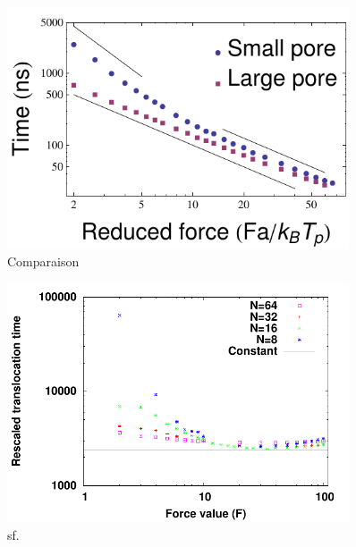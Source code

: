 \begin{figure}[H]
\begin{center}
\includegraphics[width=0.9\textwidth]{poresizecomp.pdf} 
\caption[Temps de translocation du polymère structuré, comparaison]{Comparaison}
\label{compporesize}
\end{center}
\end{figure}



\begin{figure}[H]
\begin{center}
\includegraphics[width=0.9\textwidth]{sptransloctaufresc.pdf}
\caption[Temps de translocation réajusté du polymère structuré et pore étroit]{sf.}
\label{sptransloctaufresc}
\end{center}
\end{figure}

